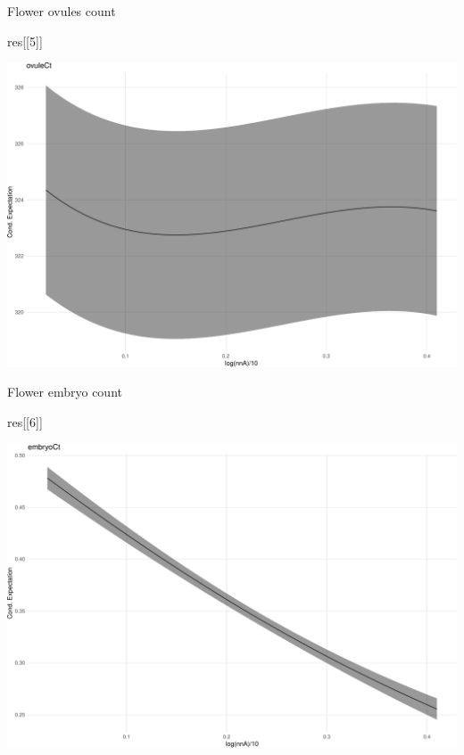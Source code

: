 \documentclass[
  ignorenonframetext,
]{beamer}
\newenvironment{Shaded}{\begin{snugshade}}{\end{snugshade}}
\newcommand{\DecValTok}[1]{\textcolor[rgb]{0.00,0.00,0.81}{#1}}
\newcommand{\NormalTok}[1]{#1}
\begin{document}
\begin{frame}[fragile]{Flower ovules count}
\protect\hypertarget{flower-ovules-count}{}
\begin{Shaded}
\begin{Highlighting}[]
\NormalTok{res[[}\DecValTok{5}\NormalTok{]]}
\end{Highlighting}
\end{Shaded}

\includegraphics{week14p2_files/figure-beamer/unnamed-chunk-57-1.pdf}
\end{frame}

\begin{frame}[fragile]{Flower embryo count}
\protect\hypertarget{flower-embryo-count}{}
\begin{Shaded}
\begin{Highlighting}[]
\NormalTok{res[[}\DecValTok{6}\NormalTok{]]}
\end{Highlighting}
\end{Shaded}

\includegraphics{week14p2_files/figure-beamer/unnamed-chunk-58-1.pdf}
\end{frame}
\end{document}
